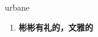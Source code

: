 
\begin{frame}
{\huge urbane}
\begin{center}
\begin{enumerate}\Large
  \item \textbf{彬彬有礼的，文雅的}
\end{enumerate}
\end{center}
\end{frame}
